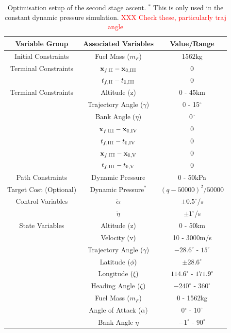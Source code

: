 \begin{table}[ht]
	\centering
	\begin{tabular}{|c|c|c|}
		\hline \textbf{Variable Group}  & \textbf{Associated Variables} & \textbf{Value/Range}\\
		\hline Initial Constraints  & Fuel Mass ($m_F$) & 1562kg\\ 
		Terminal Constraints & $\textbf{x}_{f,\textrm{\rom{2}}} - \textbf{x}_{0,\textrm{\rom{3}}}$ & 0\\ & $t_{f,\textrm{\rom{2}}} - t_{0,\textrm{\rom{3}}}$ & 0\\
		\hline Terminal Constraints & Altitude (z) & 0 - 45km\\ & Trajectory Angle ($\gamma$)& 0 - 15$^\circ$\\  & Bank Angle ($\eta$)& 0$^\circ$\\  & $\textbf{x}_{f,\textrm{\rom{3}}} - \textbf{x}_{0,\textrm{\rom{4}}}$ & 0\\ & $t_{f,\textrm{\rom{3}}} - t_{0,\textrm{\rom{4}}}$ & 0\\
		 & $\textbf{x}_{f,\textrm{\rom{3}}} - \textbf{x}_{0,\textrm{\rom{5}}}$ & 0\\ & $t_{f,\textrm{\rom{3}}} - t_{0,\textrm{\rom{5}}}$ & 0\\
		\hline Path Constraints & Dynamic Pressure& 0 - 50kPa\\ 
		\hline Target Cost (Optional) & Dynamic Pressure$^*$ & $(q-50000)^2/50000$\\ 
		\hline Control Variables & $\dot{\alpha}$ &  $\pm0.5^\circ$/s\\  & $\dot{\eta}$ &  $\pm1^\circ$/s\\ 
		\hline State Variables & Altitude (z) & 0 - 50km\\ & Velocity (v)& 10 - 3000m/s\\ & Trajectory Angle ($\gamma$)& $-28.6^\circ$ - $15^\circ$\\   & Latitude ($\phi$) &$\pm28.6^\circ$ \\  & Longitude ($\xi$)& $114.6^\circ$ - $171.9^\circ$\\   & Heading Angle ($\zeta$)& $-240^\circ$ - $360^\circ$ \\  & Fuel Mass ($m_F$)& 0 - 1562kg \\  & Angle of Attack ($\alpha$)&  0$^\circ$ - $10^\circ$ \\  & Bank Angle $\eta$& $-1^\circ$ - $90^\circ$ \\  
		\hline 
	\end{tabular} 
	\caption{Optimisation setup of the second stage ascent. $^*$ This is only used in the constant dynamic pressure simulation. \textcolor{red}{XXX Check these, particularly traj angle}}
	\label{tab:SPARTANascentsetup}
\end{table}

